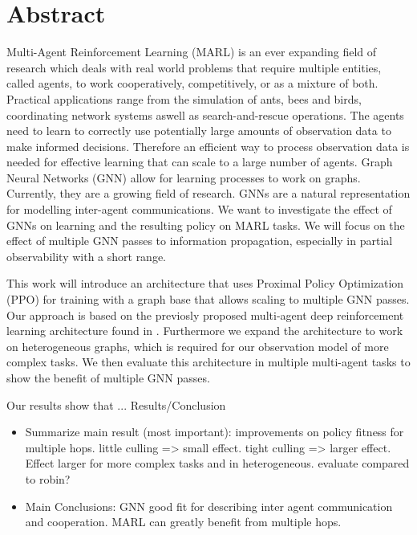 
\chapter*{Abstract}

Multi-Agent Reinforcement Learning (MARL) is an ever expanding field of research which deals with real world problems that require multiple entities, called agents, to work cooperatively, competitively, or as a mixture of both. Practical applications range from the simulation of ants, bees and birds, coordinating network systems aswell as search-and-rescue operations. The agents need to learn to correctly use potentially large amounts of observation data to make informed decisions. Therefore an efficient way to process observation data is needed for effective learning that can scale to a large number of agents. Graph Neural Networks (GNN) allow for learning processes to work on graphs. Currently, they are a growing field of research. GNNs are a natural representation for modelling inter-agent communications. We want to investigate the effect of GNNs on learning and the resulting policy on MARL tasks. We will focus on the effect of multiple GNN passes to information propagation, especially in partial observability with a short range.\par

This work will introduce an architecture that uses Proximal Policy Optimization (PPO) for training with a graph base that allows scaling to multiple GNN passes. Our approach is based on the previosly proposed multi-agent deep reinforcement learning architecture found in \citet{RobinRuede2021}. Furthermore we expand the architecture to work on heterogeneous graphs, which is required for our observation model of more complex tasks. We then evaluate this architecture in multiple multi-agent tasks to show the benefit of multiple GNN passes. 
\par

Our results show that ... %
Results/Conclusion
\begin{itemize}[noitemsep,nolistsep]
    \item Summarize main result (most important): improvements on policy fitness for multiple hops. little culling => small effect. tight culling => larger effect. Effect larger for more complex tasks and in heterogeneous. evaluate compared to robin?
    \item Main Conclusions: GNN good fit for describing inter agent communication and cooperation. MARL can greatly benefit from multiple hops.
\end{itemize}

